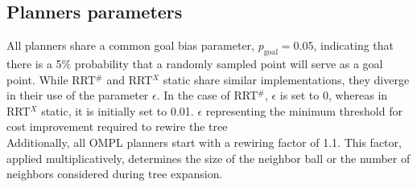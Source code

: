 \documentclass{ctuthesis}
\begin{document}
\subsection{Planners parameters}
All planners share a common goal bias parameter, \( p_{\text{goal}} = 0.05 \), 
indicating that there is a 5\% probability that a randomly sampled point 
will serve as a goal point. 
While RRT$^\#$ and RRT$^X$ static share similar implementations, 
they diverge in their use of the parameter \( \epsilon \). 
In the case of RRT$^\#$, \( \epsilon \) is set to 0, 
whereas in RRT$^X$ static, it is initially set to 0.01. 
$\epsilon$ representing the minimum
threshold for cost improvement required to rewire the tree
\\[12pt]
Additionally, all OMPL planners start with a rewiring factor of 1.1. 
This factor, applied multiplicatively, 
determines the size of the neighbor ball or the number of neighbors 
considered during tree expansion. 
\end{document}
